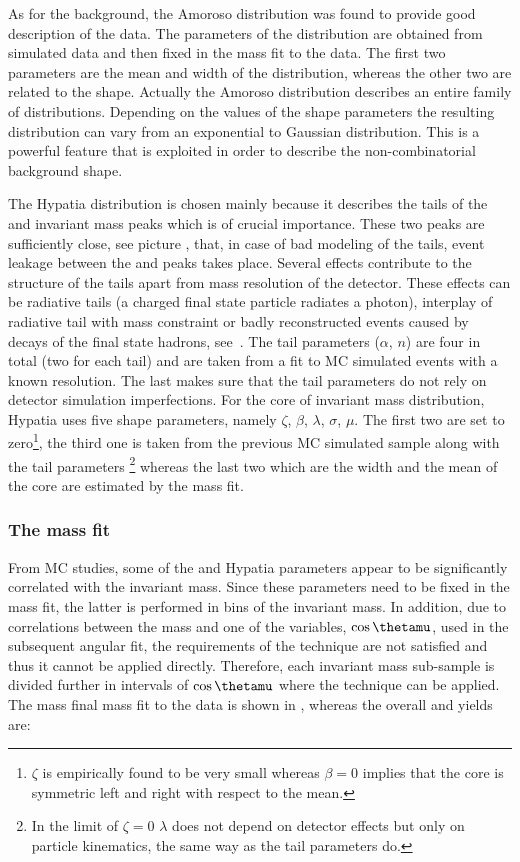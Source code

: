 As for the \LbJpsippi background, the Amoroso distribution was found to provide good description of the data.
The parameters of the distribution are obtained from simulated data and then fixed in the mass fit to the data. The first two parameters
are the mean and width of the distribution, whereas the other two are related to the shape. Actually the Amoroso distribution describes
an entire family of distributions. Depending on the values of the shape parameters the resulting distribution can vary from an exponential
to Gaussian distribution. This is a powerful feature that is exploited in order to describe the \LbJpsippi non-combinatorial background shape.

The Hypatia distribution is chosen mainly because it describes the tails of the \Bs and \Bd invariant mass peaks which is
of crucial importance. These two peaks are sufficiently close,
see picture , that, in case of bad modeling of the tails, event leakage between the \Bs and \Bd peaks
takes place. Several effects contribute to the structure of the tails apart from mass resolution of the detector. These effects
can be radiative tails (a charged final state particle radiates a photon), interplay of radiative tail with \jpsi mass constraint
or badly reconstructed events caused by decays of the final state hadrons, see~\cite{Santos:2013gra}. The tail parameters ($\alpha$, $n$)
are four in total (two for each tail) and are taken from a fit to MC simulated events with a known resolution. The last makes sure that
the tail parameters do not rely on detector simulation imperfections.
For the core of invariant mass distribution, Hypatia uses five shape parameters, namely $\zeta$, $\beta$, $\lambda$, $\sigma$, $\mu$.
The first two are set to zero\footnote{$\zeta$ is empirically found to be very small whereas
$\beta = 0$ implies that the core is symmetric left and right with respect to the mean.}, the third one is taken from the previous
MC simulated sample along with the tail parameters \footnote{In the limit of $\zeta = 0$ $\lambda$ does not depend on detector
effects but only on particle kinematics, the same way as the tail parameters do.} whereas the last two which are the width and
the mean of the core are estimated by the mass fit.

\subsubsection{The mass fit}
From MC studies, some of the \Bs and \Bd Hypatia parameters appear to be significantly correlated with the \mkpi invariant mass.
Since these parameters need to be fixed in the mass fit, the latter is performed in bins of the
\mkpi invariant mass. In addition, due to correlations between the mass and one of the variables, $\cos\thetamu$, used in the
subsequent angular fit, the requirements of the \sPlot technique are not satisfied and thus it cannot be applied directly.
Therefore, each \mkpi invariant mass sub-sample is divided further in intervals of $\cos\thetamu$ where the \sPlot technique
can be applied.  The mass final mass fit to the data is shown in , whereas the overall \Bs and \Bd yields are:

